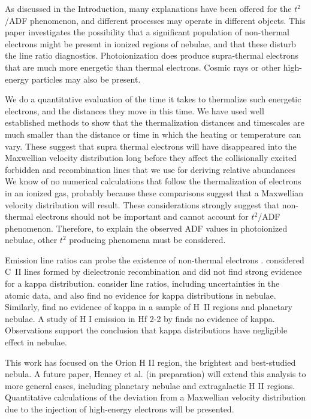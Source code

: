 \documentclass[debug, preprint, twocolumn]{rmaa}
\begin{document}
As discussed in the Introduction, many explanations have been offered for the $t^2$/ADF phenomenon,
and different processes may operate in different objects.
This paper investigates the possibility that a significant population of
non-thermal electrons might be present in ionized regions of nebulae,
and that these disturb the line ratio diagnostics.
Photoionization does produce supra-thermal electrons that are much more energetic than
thermal electrons. 
Cosmic rays or other high-energy particles may also be present.

We do a quantitative evaluation of the time it takes to thermalize such energetic electrons, and the
distances they move in this time.
We have used well established methods to show that the thermalization distances and 
timescales are much smaller than the distance or time in which the heating or temperature
can vary.
These suggest that
supra thermal electrons will have disappeared into the Maxwellian velocity distribution long before they affect the 
collisionally excited forbidden and recombination lines that we use for deriving relative abundances
We know of no numerical calculations that follow the thermalization of electrons in an ionized gas,
probably because these comparisons suggest that a Maxwellian velocity distribution will result.
These considerations strongly suggest that non-thermal electrons should not be  important 
and cannot account for $t^2$/ADF phenomenon.
Therefore, to explain the observed ADF values in photoionized nebulae, other $t^2$ producing phenomena
must be considered.

Emission line ratios can probe the existence of non-thermal electrons \citep{2013SSRv..178..271B}.
\citet{2013MNRAS.430..599S} considered C~II lines formed by dielectronic recombination
and did not find strong evidence for a kappa distribution.
\citet{2014ApJ...785...91M} consider line ratios, including uncertainties in the atomic data,
and also find no evidence for kappa distributions in nebulae.
Similarly, \citet{2016ApJ...817...68Z} find no evidence of kappa in a sample of H~II regions
and planetary nebulae.
A study of H I emission in Hf 2-2 by \citet{2014MNRAS.440.2581S} finds no evidence of kappa.
Observations support the conclusion that kappa distributions have negligible effect in nebulae.

This work has focused on the Orion H II region, the brightest and best-studied nebula.  A future paper, Henney et al. (in preparation) will extend this analysis to more general cases, including planetary nebulae and extragalactic H II regions.  Quantitative calculations of the deviation from a Maxwellian velocity distribution due to the injection of high-energy electrons will be presented.
\end{document}
